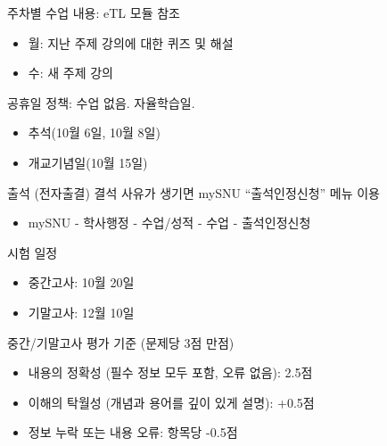 \documentclass[11pt, aspectratio=169]{beamer}
\begin{document}
\begin{frame}[t]{}
  \begin{block}{주차별 수업 내용: eTL 모듈 참조}
    \begin{itemize}
      \item 월: 지난 주제 강의에 대한 퀴즈 및 해설
      \item 수: 새 주제 강의
    \end{itemize}     
  \end{block}

  \begin{block}{공휴일 정책: 수업 없음. 자율학습일.}
    \begin{itemize}
      \item 추석(10월 6일, 10월 8일)
      \item 개교기념일(10월 15일)
    \end{itemize}      
  \end{block}
  \begin{block}{출석 (전자출결)}
    결석 사유가 생기면 mySNU “출석인정신청” 메뉴 이용
    \begin{itemize}
      \item mySNU - 학사행정 - 수업/성적 - 수업 - 출석인정신청
    \end{itemize}
  \end{block}

\end{frame}

\begin{frame}[t]{}
    \begin{block}{시험 일정}
      \begin{itemize}
        \item 중간고사: 10월 20일
        \item 기말고사: 12월 10일
      \end{itemize}       
    \end{block}

  \begin{block}{중간/기말고사 평가 기준 (문제당 3점 만점)}
    \begin{itemize}
      \item 내용의 정확성 (필수 정보 모두 포함, 오류 없음): 2.5점
      \item 이해의 탁월성 (개념과 용어를 깊이 있게 설명): +0.5점
      \item 정보 누락 또는 내용 오류: 항목당 -0.5점
    \end{itemize}
  \end{block}

\end{frame}
\end{document}
